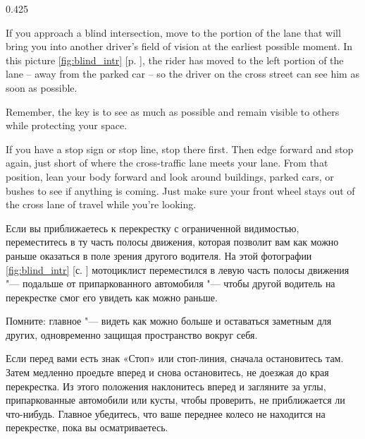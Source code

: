 \begin{langblock}{0.425}
	\begin{eng}
	
	If you approach a blind intersection, move to the portion of the lane that will bring you into another driver's field of vision at the earliest possible moment. In this picture \ref{fig:blind_intr} [p. \pageref{fig:blind_intr}], the rider has moved to the left portion of the lane -- away from the parked car -- so the driver on the cross street can see him as soon as possible.
	
	Remember, the key is to see as much as possible and remain visible to others while protecting your space.
	
	If you have a stop sign or stop line, stop there first. Then edge forward and stop again, just short of where the cross-traffic lane meets your lane. From that position, lean your body forward and look around buildings, parked cars, or bushes to see if anything is coming. Just make sure your front wheel stays out of the cross lane of travel while you're looking.
	\end{eng}
	\begin{rus}
		
		Если вы приближаетесь к перекрестку с ограниченной видимостью, переместитесь в ту часть полосы движения, которая позволит вам как можно раньше оказаться в поле зрения другого водителя. На этой фотографии \ref{fig:blind_intr} [с. \pageref{fig:blind_intr}] мотоциклист переместился в левую часть полосы движения "--- подальше от припаркованного автомобиля "--- чтобы другой водитель на перекрестке смог его увидеть как можно раньше.
		
		Помните: главное "--- видеть как можно больше и оставаться заметным для других, одновременно защищая пространство вокруг себя.
		
		Если перед вами есть знак «Стоп» или стоп-линия, сначала остановитесь там. Затем медленно проедьте вперед и снова остановитесь, не доезжая до края перекрестка. Из этого положения наклонитесь вперед и загляните за углы, припаркованные автомобили или кусты, чтобы проверить, не приближается ли что-нибудь. Главное убедитесь, что ваше переднее колесо не находится на перекрестке, пока вы осматриваетесь.
\end{rus}
\end{langblock}






